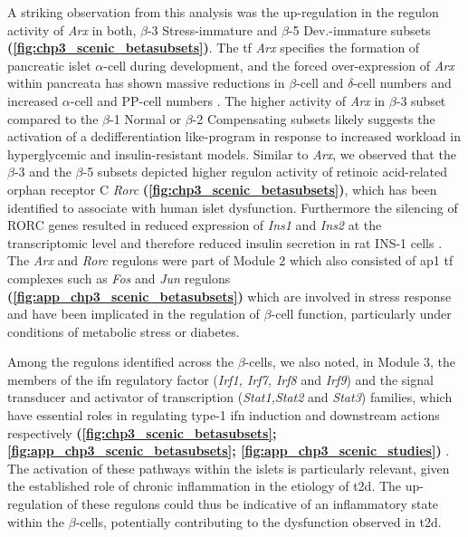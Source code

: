 \par  A striking observation from this analysis was the up-regulation in the regulon activity of \textit{Arx} in both, $\beta$-3 Stress-immature and $\beta$-5 Dev.-immature subsets \textbf{(\autoref{fig:chp3_scenic_betasubsets})}. The \gls{tf} \textit{Arx} specifies the formation of pancreatic islet $\alpha$-cell during development, and the forced over-expression of \textit{Arx} within pancreata has shown massive reductions in $\beta$-cell and $\delta$-cell numbers and increased $\alpha$-cell and PP-cell numbers \textbf{\cite{van_der_meulen_role_2015}}. The higher activity of \textit{Arx} in $\beta$-3 subset compared to the $\beta$-1 Normal or $\beta$-2 Compensating subsets likely suggests the activation of a dedifferentiation like-program in response to increased workload in hyperglycemic and insulin-resistant models. Similar to \textit{Arx}, we observed that the $\beta$-3 and the $\beta$-5 subsets depicted higher regulon activity of retinoic acid-related orphan receptor C \textit{Rorc} \textbf{(\autoref{fig:chp3_scenic_betasubsets})}, which has been identified to associate with human islet dysfunction. Furthermore the silencing of RORC genes resulted in reduced expression of \textit{Ins1} and \textit{Ins2} at the transcriptomic level and therefore reduced insulin secretion in rat INS-1 cells \textbf{\cite{taneera_rorb_2019}}. The \textit{Arx} and \textit{Rorc} regulons were part of Module 2 which also consisted of \gls{ap1} \gls{tf} complexes such as \textit{Fos} and \textit{Jun} regulons \textbf{(\autoref{fig:app_chp3_scenic_betasubsets})} which are involved in stress response and have been implicated in the regulation of $\beta$-cell function, particularly under conditions of metabolic stress or diabetes.\\

\par  Among the regulons identified across the $\beta$-cells, we also noted, in Module 3, the members of the \gls{ifn} regulatory factor (\textit{Irf1, Irf7, Irf8} and \textit{Irf9}) and the signal transducer and activator of transcription (\textit{Stat1,Stat2} and \textit{Stat3}) families, which have essential roles in regulating type-1 \gls{ifn} induction and downstream actions respectively \textbf{(\autoref{fig:chp3_scenic_betasubsets}; \autoref{fig:app_chp3_scenic_betasubsets}; \autoref{fig:app_chp3_scenic_studies})} \textbf{\cite{mogensen_irf_2019}}. The activation of these pathways within the islets is particularly relevant, given the established role of chronic inflammation in the etiology of \gls{t2d}. The up-regulation of these regulons could thus be indicative of an inflammatory state within the $\beta$-cells, potentially contributing to the dysfunction observed in \gls{t2d}.\\


